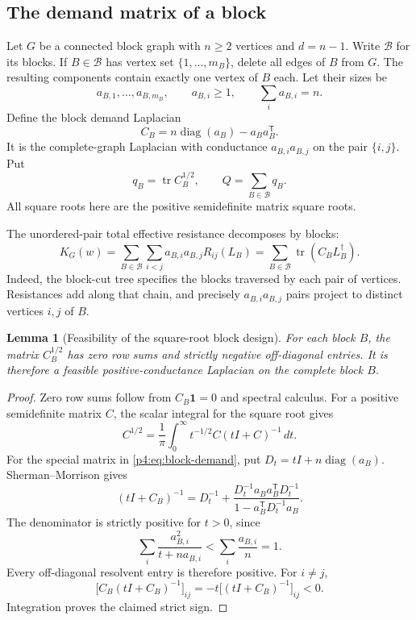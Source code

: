 \documentclass[11pt,a4paper]{article}
\newtheorem{lemma}[theorem]{Lemma}
\theoremstyle{definition}
\theoremstyle{remark}
\numberwithin{equation}{section}
\begin{document}
\subsection{The demand matrix of a block}

Let $G$ be a connected block graph with $n\geq2$ vertices and
$d=n-1$.  Write $\mathcal B$ for its blocks.
If $B\in\mathcal B$ has vertex set $\{1,\ldots,m_B\}$, delete all
edges of $B$ from $G$.  The resulting components contain exactly
one vertex of $B$ each.  Let their sizes be
\[
 a_{B,1},\ldots,a_{B,m_B},\qquad
 a_{B,i}\geq1,\qquad \sum_i a_{B,i}=n.
\]
Define the block demand Laplacian
\begin{equation}\label{p4:eq:block-demand}
 C_B=n\operatorname{diag}(a_B)-a_Ba_B^{\mathsf T}.
\end{equation}
It is the complete-graph Laplacian with conductance
$a_{B,i}a_{B,j}$ on the pair $\{i,j\}$.
Put
\[
 q_B=\operatorname{tr}C_B^{1/2},\qquad
 Q=\sum_{B\in\mathcal B}q_B.
\]
All square roots here are the positive semidefinite matrix square roots.

The unordered-pair total effective resistance decomposes by blocks:
\begin{equation}\label{p4:eq:block-objective-decomposition}
 K_G(w)=\sum_{B\in\mathcal B}
    \sum_{i<j}a_{B,i}a_{B,j}R_{ij}(L_B)
 =\sum_{B\in\mathcal B}\operatorname{tr}(C_BL_B^\dagger).
\end{equation}
Indeed, the block-cut tree specifies the blocks traversed by each
pair of vertices.  Resistances add along that chain, and precisely
$a_{B,i}a_{B,j}$ pairs project to distinct vertices $i,j$ of $B$.

\begin{lemma}[Feasibility of the square-root block design]
\label{p4:lem:block-sqrt-feasible}
For each block $B$, the matrix $C_B^{1/2}$ has zero row sums and
strictly negative off-diagonal entries.  It is therefore a feasible
positive-conductance Laplacian on the complete block $B$.
\end{lemma}

\begin{proof}
Zero row sums follow from $C_B\mathbf1=0$ and spectral calculus.
For a positive semidefinite matrix $C$, the scalar integral for the
square root gives
\[
 C^{1/2}=\frac1\pi\int_0^\infty
          t^{-1/2}C(tI+C)^{-1}\,dt.
\]
For the special matrix in \eqref{p4:eq:block-demand}, put
$D_t=tI+n\operatorname{diag}(a_B)$.
Sherman--Morrison gives
\[
 (tI+C_B)^{-1}
 =D_t^{-1}
 +\frac{D_t^{-1}a_Ba_B^{\mathsf T}D_t^{-1}}
        {1-a_B^{\mathsf T}D_t^{-1}a_B}.
\]
The denominator is strictly positive for $t>0$, since
\[
 \sum_i\frac{a_{B,i}^2}{t+na_{B,i}}
 <\sum_i\frac{a_{B,i}}n=1.
\]
Every off-diagonal resolvent entry is therefore positive.
For $i\ne j$,
\[
 \bigl[C_B(tI+C_B)^{-1}\bigr]_{ij}
 =-t\bigl[(tI+C_B)^{-1}\bigr]_{ij}<0.
\]
Integration proves the claimed strict sign.
\end{proof}
\end{document}
